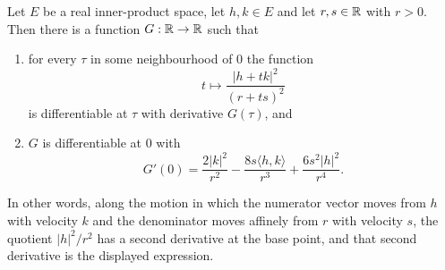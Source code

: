 \begin{lemma}
Let $E$ be a real inner-product space, let $h,k\in E$ and let $r,s\in\mathbb{R}$ with
$r>0$. Then there is a function $G:\mathbb{R}\to\mathbb{R}$ such that
\begin{enumerate}
\item for every $\tau$ in some neighbourhood of $0$ the function
  \[
    t\longmapsto\frac{|h+tk|^2}{(r+ts)^2}
  \]
  is differentiable at $\tau$ with derivative $G(\tau)$, and
\item $G$ is differentiable at $0$ with
  \[
    G'(0)=\frac{2|k|^2}{r^2}-\frac{8s\langle h,k\rangle}{r^3}
      +\frac{6s^2|h|^2}{r^4}.
  \]
\end{enumerate}
In other words, along the motion in which the numerator vector moves from $h$
with velocity $k$ and the denominator moves affinely from $r$ with velocity $s$,
the quotient $|h|^2/r^2$ has a second derivative at the base point, and that
second derivative is the displayed expression.
\end{lemma}

